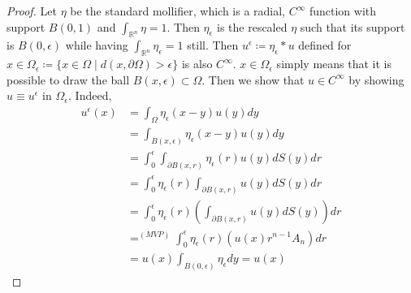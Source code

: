 \documentclass[openany, amssymb, psamsfonts]{amsart}
\theoremstyle{definition}
\numberwithin{equation}{section}
\newcommand{\bbr}{\mathbb{R}}
\begin{document}
\begin{proof}
Let $\eta$ be the standard mollifier, which is a radial, $C^\infty$ function with support $B(0, 1)$ and $\int_{\bbr^n} \eta = 1$. Then $\eta_\epsilon$ is the rescaled $\eta$ such that its support is $B(0, \epsilon)$ while having $\int_{\bbr^n} \eta_\epsilon = 1$ still. Then $u^\epsilon \coloneqq \eta_\epsilon * u$ defined for $x \in \Omega_\epsilon \coloneqq \{x \in \Omega \mid d(x, \partial \Omega) > \epsilon\}$ is also $C^\infty$. $x \in \Omega_\epsilon$ simply means that it is possible to draw the ball $B(x, \epsilon) \subset \Omega$. Then we show that $u \in C^\infty$ by showing $u \equiv u^\epsilon$ in $\Omega_\epsilon$. Indeed, 
\begin{align*}
u^\epsilon(x) &= \int_{\Omega} \eta_\epsilon(x-y) u(y) dy \\
&= \int_{B(x, \epsilon)}  \eta_\epsilon(x-y) u(y) dy \\
&= \int_{0}^{\epsilon} \int_{\partial B(x, r)} \eta_\epsilon(r) u(y) dS(y) dr \\
&= \int_{0}^{\epsilon} \eta_\epsilon(r) \int_{\partial B(x, r)}  u(y) dS(y) dr \\
&= \int_{0}^{\epsilon} \eta_\epsilon(r) \left(\int_{\partial B(x, r)}  u(y) dS(y)\right) dr \\
&=^{(MVP)} \int_{0}^{\epsilon} \eta_\epsilon(r) (u(x) r^{n-1} A_n) dr \\
&= u(x) \int_{B(0, \epsilon)} \eta_\epsilon dy = u(x)
\end{align*}
\end{proof}
\end{document}
